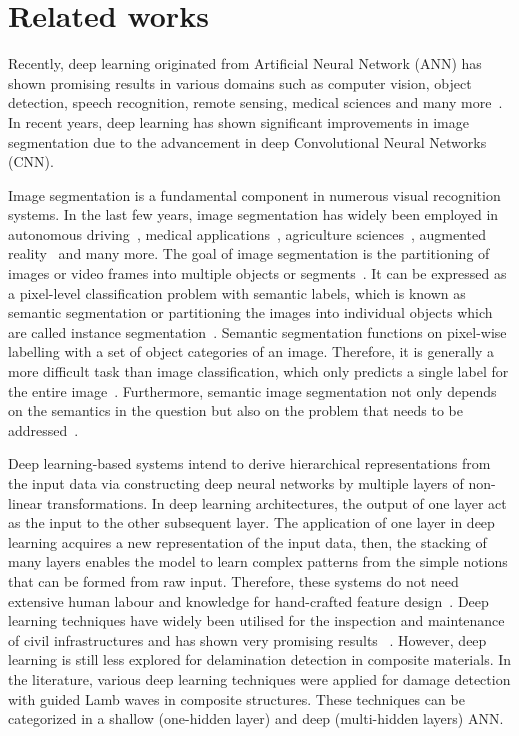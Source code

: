 \section{Related works}
\label{related_works}
Recently, deep learning originated from Artificial Neural Network (ANN) has shown promising results in various domains such as computer vision, object detection, speech recognition, remote sensing, medical sciences and many more~\cite{deng2014deep, mohanty2016using, zhang2020well, pashaei2020review}. 
In recent years, deep learning has shown significant improvements in image segmentation due to the advancement in deep Convolutional Neural Networks (CNN). 

Image segmentation is a fundamental component in numerous visual recognition systems. 
In the last few years, image segmentation has widely been employed in autonomous driving~\cite{zhang2013understanding, cordts2016cityscapes, ros2016synthia, li2018real}, medical applications~\cite{taghanaki2020deep}, agriculture sciences~\cite{milioto2018real}, augmented reality~\cite{miksik2015semantic} and many more. 
The goal of image segmentation is the partitioning of images or video frames into multiple objects or segments~\cite{szeliski2010computer}. 
It can be expressed as a pixel-level classification problem with semantic labels, which is known as semantic segmentation or partitioning the images into individual objects which are called instance segmentation~\cite{minaee2020image}. 
Semantic segmentation functions on pixel-wise labelling with a set of object categories of an image.  
Therefore, it is generally a more difficult task than image classification, which only predicts a single label for the entire image~\cite{minaee2020image}. 
Furthermore, semantic image segmentation not only depends on the semantics in the question but also on the problem that needs to be addressed~\cite{ghosh2019understanding}.

Deep learning-based systems intend to derive hierarchical representations from the input data via constructing deep neural networks by multiple layers of non-linear transformations. 
In deep learning architectures, the output of one layer act as the input to the other subsequent layer. 
The application of one layer in deep learning acquires a new representation of the input data, then, the stacking of many layers enables the model to learn complex patterns from the simple notions that can be formed from raw input. 
Therefore, these systems do not need extensive human labour and knowledge for hand-crafted feature design~\cite{Zhao2019b, Yuan2020}.
Deep learning techniques have widely been utilised for the inspection and maintenance of civil infrastructures and has shown very promising results ~\cite{cha2017b, lin2017structural, Liu2019}. 
However, deep learning is still less explored for delamination detection in composite materials.   
In the literature, various deep learning techniques were applied for damage detection with guided Lamb waves in composite structures.
These techniques can be categorized in a shallow (one-hidden layer) and deep (multi-hidden layers) ANN.

